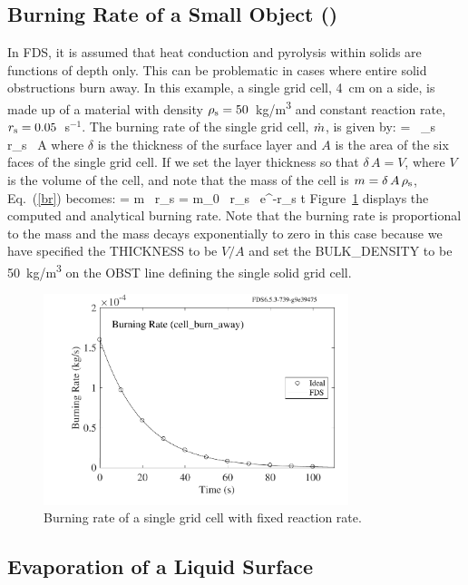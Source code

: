 \documentclass[11pt]{book}
\begin{document}
\subsection{Burning Rate of a Small Object (\texorpdfstring{}{cell\_burn\_away})}

In FDS, it is assumed that heat conduction and pyrolysis within solids are functions of depth only. This can be problematic in cases where entire solid obstructions burn away. In this example, a single grid cell, 4~cm on a side, is made up of a material with density $\rho_{\rm s}=50$~\si{kg/m^3} and constant reaction rate, $r_{\rm s}=0.05$~s$^{-1}$. The burning rate of the single grid cell, $\dot{m}$, is given by:
\be
   \dm = \delta \, \rho_{\rm s} \, r_{\rm s} \, A  \label{br}
\ee
where $\delta$ is the thickness of the surface layer and $A$ is the area of the six faces of the single grid cell. If we set the layer thickness so that $\delta \, A=V$, where $V$ is the volume of the cell, and note that the mass of the cell is $m=\delta \, A \, \rho_{\rm s}$, Eq.~(\ref{br}) becomes:
\be
   \dm = m \, r_{\rm s} = m_0 \, r_{\rm s} \, {\rm e}^{-r_{\rm s} t}
\ee
Figure~\ref{cell_burn_away} displays the computed and analytical burning rate. Note that the burning rate is proportional to the mass and the mass decays exponentially to zero in this case because we have specified the {\ct THICKNESS} to be $V/A$ and set the {\ct BULK\_DENSITY} to be 50~\si{kg/m^3} on the {\ct OBST} line defining the single solid grid cell.
\begin{figure}[ht]
\begin{center}
\includegraphics[width=3.5in]{SCRIPT_FIGURES/cell_burn_away}
\end{center}
\caption[The {\ct cell\_burn\_away} test case.]{Burning rate of a single grid cell with fixed reaction rate.}
\label{cell_burn_away}
\end{figure}


\subsection{Evaporation of a Liquid Surface}
\end{document}
